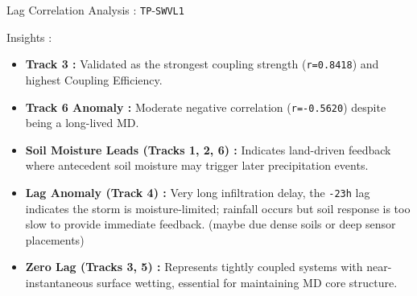 \documentclass[8pt, aspectratio=169]{beamer}
\begin{document}
\begin{frame}{Lag Correlation Analysis : \texttt{TP}-\texttt{SWVL1}}
    \footnotesize
    \begin{block}{Insights :}
        \begin{itemize}
            \item \textbf{Track 3 :} Validated as the strongest coupling strength (\texttt{r=0.8418}) and highest Coupling Efficiency.
            \item \textbf{Track 6 Anomaly :} Moderate negative correlation (\texttt{r=-0.5620}) despite being a long-lived MD.
            \item \textbf{Soil Moisture Leads (Tracks 1, 2, 6) :} Indicates land-driven feedback where antecedent soil moisture may trigger later precipitation events.
            \item \textbf{Lag Anomaly (Track 4) :} Very long infiltration delay, the \texttt{-23h} lag indicates the storm is moisture-limited; rainfall occurs but soil response is too slow to provide immediate feedback. (maybe due dense soils or deep sensor placements)
            \item \textbf{Zero Lag (Tracks 3, 5) :} Represents tightly coupled systems with near-instantaneous surface wetting, essential for maintaining MD core structure.
        \end{itemize}
    \end{block}
\end{frame}
\end{document}
